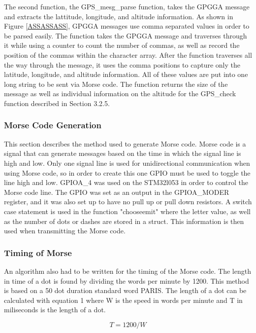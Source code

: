 \documentclass[12pt, letterpaper]{article}
\begin{document}
The second function, the GPS\_mesg\_parse function, takes the GPGGA message and extracts the lattitude, longitude, and altitude information. As shown in Figure \ref{ASSASSASS}, GPGGA messages use comma separated values in order to be parsed easily.  The function takes the GPGGA message and traverses through it while using a counter to count the number of commas, as well as record the position of the commas within the character array. After the function traverses all the way through the message, it uses the comma positions to capture only the latitude, longitude, and altitude information. All of these values are put into one long string to be sent via Morse code. The function returns the size of the message as well as individual information on the altitude for the GPS\_check function described in Section 3.2.5.


\subsubsection{Morse Code Generation}
This section describes the method used to generate Morse code. Morse code is a signal that can generate messages based on the time in which the signal line is high and low. Only one signal line is used for unidirectional communication when using Morse code, so in order to create this one GPIO must be used to toggle the line high and low. GPIOA\_4 was used on the STM32l053 in order to control the Morse code line. The GPIO was set as an output in the GPIOA\_MODER register, and it was also set up to have no pull up or pull down resistors. A switch case statement is used in the function "chooseemit" where the letter value, as well as the number of dots or dashes are stored in a struct. This information is then used when transmitting the Morse code. 

\subsubsection{Timing of Morse}
An algorithm also had to be written for the timing of the Morse code. The length in time of a dot is found by dividing the words per minute by 1200. This method is based on a 50 dot duration standard word PARIS. The length of a dot can be calculated with equation 1 where W is the speed in words per minute and T in miliseconds is the length of a dot.

\begin{equation}
    T = 1200/W
\end{equation}
\end{document}
